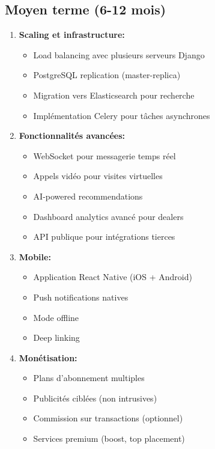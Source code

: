 \subsection{Moyen terme (6-12 mois)}

\begin{enumerate}
    \item \textbf{Scaling et infrastructure:}
    \begin{itemize}
        \item Load balancing avec plusieurs serveurs Django
        \item PostgreSQL replication (master-replica)
        \item Migration vers Elasticsearch pour recherche
        \item Implémentation Celery pour tâches asynchrones
    \end{itemize}

    \item \textbf{Fonctionnalités avancées:}
    \begin{itemize}
        \item WebSocket pour messagerie temps réel
        \item Appels vidéo pour visites virtuelles
        \item AI-powered recommendations
        \item Dashboard analytics avancé pour dealers
        \item API publique pour intégrations tierces
    \end{itemize}

    \item \textbf{Mobile:}
    \begin{itemize}
        \item Application React Native (iOS + Android)
        \item Push notifications natives
        \item Mode offline
        \item Deep linking
    \end{itemize}

    \item \textbf{Monétisation:}
    \begin{itemize}
        \item Plans d'abonnement multiples
        \item Publicités ciblées (non intrusives)
        \item Commission sur transactions (optionnel)
        \item Services premium (boost, top placement)
    \end{itemize}
\end{enumerate}

